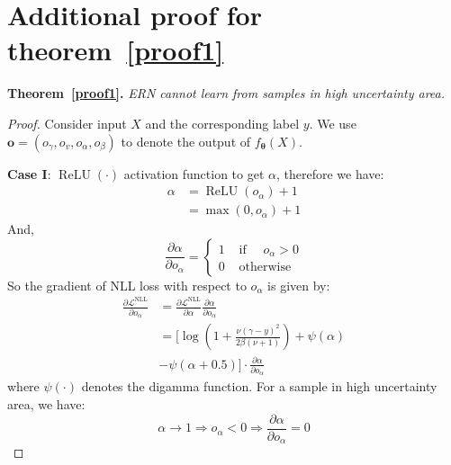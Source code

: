 \appendix

\section{Additional proof for theorem~\ref{proof1}}
\label{appendix_1}
\textbf{Theorem~\ref{proof1}.} \textit{ERN cannot learn from samples in high uncertainty area.}


\begin{proof}
Consider input $X$ and the corresponding label $y$. We use $\boldsymbol{o}=(o_{\gamma}, o_{v}, o_{\alpha}, o_{\beta})$ to denote the output of $f_{\boldsymbol{\theta}}(X)$.

\textbf{Case I}: $\operatorname{ReLU}(\cdot)$ activation function to get $\alpha$, therefore we have:
\begin{equation}
\begin{aligned}
\alpha&=\operatorname{ReLU}(o_{\alpha}) + 1  \\
      &= \max(0,o_{\alpha})+1 
\end{aligned}
\end{equation}
And,
\begin{equation}
    \frac{\partial \alpha}{\partial o_{\alpha}}=
    \begin{cases}1 & \text { if } \quad o_{\alpha}>0 \\ 
    0 & \text { otherwise }
    \end{cases}
\end{equation}
So the gradient of NLL loss with respect to $o_{\alpha}$ is given by:
\begin{equation}
\begin{aligned}
\frac{\partial \mathcal{L}^{\mathrm{NLL}}}{\partial o_\alpha} &= \frac{\partial \mathcal{L}^{\mathrm{NLL}}}{\partial \alpha} \frac{\partial \alpha}{\partial o_{\alpha}}     \\
&=[\log(1+\frac{\nu(\gamma-y)^2}{2\beta(\nu+1)}) +\psi(\alpha) \\
&- \psi(\alpha+0.5)] \cdot \frac{\partial \alpha}{\partial o_{\alpha}}
\end{aligned}
\end{equation}
where $\psi(\cdot)$ denotes the digamma function.
For a sample in high uncertainty area, we have:
\begin{equation}
    \alpha \rightarrow 1 \Rightarrow o_\alpha <0 \Rightarrow \frac{\partial \alpha}{\partial o_{\alpha}}=0
\end{equation}






\end{proof}
